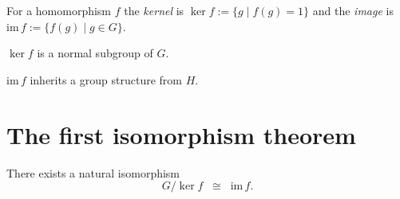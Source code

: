 \begin{definition}\label{def:ker_img}
For a homomorphism $f$ the \emph{kernel} is
$\ker f := \{g\mid f(g)=1\}$ and the \emph{image} is
$\mathrm{im}\,f := \{f(g)\mid g\in G\}$.
\end{definition}

\begin{lemma}\label{lem:ker_normal}
$\ker f$ is a normal subgroup of $G$.
\end{lemma}

\begin{lemma}\label{lem:img_group}
$\mathrm{im}\,f$ inherits a group structure from $H$.
\end{lemma}


\section{The first isomorphism theorem}

\begin{theorem}\label{thm:first_iso}
There exists a natural isomorphism
\[
G/\ker f\;\;\cong\;\;\mathrm{im}\,f .
\]
\end{theorem}
